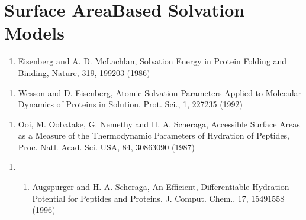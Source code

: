 \documentclass[letterpaper,11pt,english]{sphinxmanual}
\begin{document}
\section{Surface Area\sphinxhyphen{}Based Solvation Models}
\label{\detokenize{text/references:surface-area-based-solvation-models}}\begin{enumerate}
%
\setcounter{enumi}{3}
\item {} 
Eisenberg and A. D. McLachlan, Solvation Energy in Protein Folding and Binding, Nature, 319, 199\sphinxhyphen{}203 (1986)

\end{enumerate}
\begin{enumerate}
%
\setcounter{enumi}{11}
\item {} 
Wesson and D. Eisenberg, Atomic Solvation Parameters Applied to Molecular Dynamics of Proteins in Solution, Prot. Sci., 1, 227\sphinxhyphen{}235 (1992)

\end{enumerate}
\begin{enumerate}
%
\setcounter{enumi}{19}
\item {} 
Ooi, M. Oobatake, G. Nemethy and H. A. Scheraga, Accessible Surface Areas as a Measure of the Thermodynamic Parameters of Hydration of Peptides, Proc. Natl. Acad. Sci. USA, 84, 3086\sphinxhyphen{}3090 (1987)

\end{enumerate}
\begin{enumerate}
%
\setcounter{enumi}{9}
\item {} \begin{enumerate}
%
\setcounter{enumii}{3}
\item {} 
Augspurger and H. A. Scheraga, An Efficient, Differentiable Hydration Potential for Peptides and Proteins, J. Comput. Chem., 17, 1549\sphinxhyphen{}1558 (1996)

\end{enumerate}

\end{enumerate}
\end{document}
